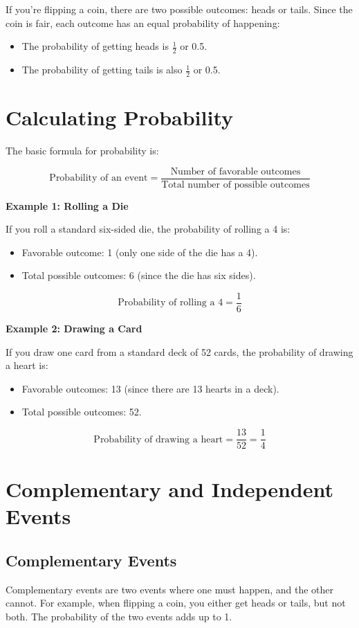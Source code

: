 If you're flipping a coin, there are two possible outcomes: heads or tails. Since the coin is fair, each outcome has an equal probability of happening:

\begin{itemize}
    \item The probability of getting heads is $\frac{1}{2}$ or 0.5.
    \item The probability of getting tails is also $\frac{1}{2}$ or 0.5.
\end{itemize}

\section{Calculating Probability}
The basic formula for probability is:

\[
\text{Probability of an event} = \frac{\text{Number of favorable outcomes}}{\text{Total number of possible outcomes}}
\]

\textbf{Example 1: Rolling a Die}

If you roll a standard six-sided die, the probability of rolling a 4 is:

\begin{itemize}
    \item Favorable outcome: 1 (only one side of the die has a 4).
    \item Total possible outcomes: 6 (since the die has six sides).
\end{itemize}

\[
\text{Probability of rolling a 4} = \frac{1}{6}
\]

\textbf{Example 2: Drawing a Card}

If you draw one card from a standard deck of 52 cards, the probability of drawing a heart is:

\begin{itemize}
    \item Favorable outcomes: 13 (since there are 13 hearts in a deck).
    \item Total possible outcomes: 52.
\end{itemize}

\[
\text{Probability of drawing a heart} = \frac{13}{52} = \frac{1}{4}
\]

\section{Complementary and Independent Events}
\subsection{Complementary Events}
Complementary events are two events where one must happen, and the other cannot. For example, when flipping a coin, you either get heads or tails, but not both. The probability of the two events adds up to 1.


